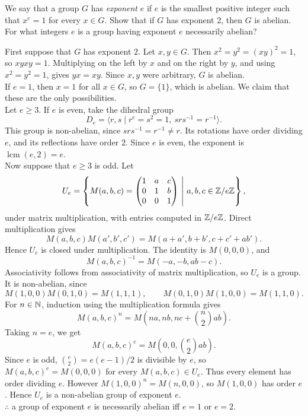 \documentclass[../Odyssey_Project.tex]{subfiles}
\begin{document}
\begin{exercise}
\label{ex:1.2}
We say that a group $G$ has \emph{exponent} $e$ if $e$ is the smallest positive integer such that $x^e = 1$ for every $x \in G$. Show that if $G$ has exponent 2, then $G$ is abelian. For what integers $e$ is a group having exponent $e$ necessarily abelian?
\end{exercise}
\begin{solution}
First suppose that \(G\) has exponent \(2\). Let \(x,y \in G\). Then \(x^2 = y^2 = (xy)^2 = 1\), so \(xyxy = 1\). Multiplying on the left by \(x\) and on the right by \(y\), and using \(x^2 = y^2 = 1\), gives \(yx = xy\). Since \(x,y\) were arbitrary, \(G\) is abelian. \\
If \(e = 1\), then \(x = 1\) for all \(x \in G\), so \(G = \{1\}\), which is abelian. We claim that these are the only possibilities. \\
Let \(e \geq 3\). If \(e\) is even, take the dihedral group
\[
    D_e = \langle r,s \mid r^e = s^2 = 1,\ srs^{-1} = r^{-1}\rangle.
\]
This group is non-abelian, since \(srs^{-1} = r^{-1} \ne r\). Its rotations have order dividing \(e\), and its reflections have order \(2\). Since \(e\) is even, the exponent is \(\operatorname{lcm}(e,2) = e\). \\
Now suppose that \(e \geq 3\) is odd. Let
\[
    U_e =
    \left\{
    M(a,b,c) =
    \begin{pmatrix}
        1 & a & c \\
        0 & 1 & b \\
        0 & 0 & 1
    \end{pmatrix}
    \ \middle|\ a,b,c \in \mathbb{Z}/e\mathbb{Z}
    \right\},
\]
under matrix multiplication, with entries computed in \(\mathbb{Z}/e\mathbb{Z}\). Direct multiplication gives
\[
    M(a,b,c)M(a',b',c') = M(a+a', b+b', c+c'+ab').
\]
Hence \(U_e\) is closed under multiplication. The identity is \(M(0,0,0)\), and
\[
    M(a,b,c)^{-1} = M(-a,-b,ab-c).
\]
Associativity follows from associativity of matrix multiplication, so \(U_e\) is a group. It is non-abelian, since
\[
    M(1,0,0)M(0,1,0) = M(1,1,1),
    \qquad
    M(0,1,0)M(1,0,0) = M(1,1,0).
\]
For \(n \in \mathbb{N}\), induction using the multiplication formula gives
\[
    M(a,b,c)^n = M\left(na, nb, nc+\binom{n}{2}ab\right).
\]
Taking \(n=e\), we get
\[
    M(a,b,c)^e = M\left(0,0,\binom{e}{2}ab\right).
\]
Since \(e\) is odd, \(\binom{e}{2} = e(e-1)/2\) is divisible by \(e\), so \(M(a,b,c)^e = M(0,0,0)\) for every \(M(a,b,c) \in U_e\). Thus every element has order dividing \(e\). However \(M(1,0,0)^n = M(n,0,0)\), so \(M(1,0,0)\) has order \(e\). Hence \(U_e\) is a non-abelian group of exponent \(e\). \\
\(\therefore\) a group of exponent \(e\) is necessarily abelian iff \(e = 1\) or \(e = 2\).
\end{solution}
\end{document}
